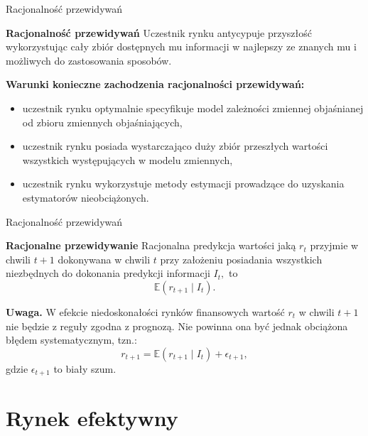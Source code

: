 \documentclass[a4paper, 11pt]{beamer}
\begin{document}
	\begin{frame}{Racjonalność przewidywań}
		\begin{block}{\textbf{Racjonalność przewidywań}}
			Uczestnik rynku antycypuje przyszłość wykorzystując cały zbiór dostępnych mu informacji w najlepszy
			ze znanych mu i możliwych do zastosowania sposobów.
		\end{block}
		\textbf{Warunki konieczne zachodzenia racjonalności przewidywań:}
		\begin{itemize}
			\item uczestnik rynku optymalnie specyfikuje model zależności zmiennej objaśnianej
				od zbioru zmiennych objaśniających,
			\item uczestnik rynku posiada wystarczająco duży zbiór przeszłych wartości wszystkich
				występujących w modelu zmiennych,
			\item uczestnik rynku wykorzystuje metody estymacji prowadzące do uzyskania
				estymatorów nieobciążonych.
		\end{itemize}
	\end{frame}
	
	\begin{frame}{Racjonalność przewidywań}
		\begin{block}{\textbf{Racjonalne przewidywanie}}
			Racjonalna predykcja wartości jaką $r_t$ przyjmie w chwili $t+1$ dokonywana w chwili $t$ przy założeniu
			posiadania wszystkich niezbędnych do dokonania predykcji informacji $I_t,$ to \[
				\mathbb{E}\left(r_{t+1} \mid I_t\right).
			\]
		\end{block}
		\begin{alert}{\textbf{Uwaga.}}
			W efekcie niedoskonałości rynków finansowych wartość $r_t$ w chwili $t+1$ nie będzie z reguły zgodna
			z prognozą. Nie powinna ona być jednak obciążona błędem systematycznym, tzn.: \[
				r_{t+1} = \mathbb{E}\left(r_{t+1} \mid I_t\right) + \epsilon_{t+1},
			\] gdzie $\epsilon_{t+1}$ to biały szum.
		\end{alert}
	\end{frame}
	
	\section{Rynek efektywny}
	
\end{document}
